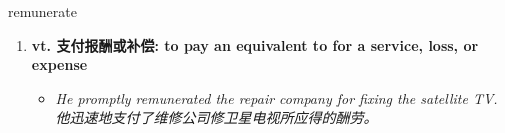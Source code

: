 
\begin{frame}
{\huge remunerate}
\begin{center}
\begin{enumerate}\Large
  \item \textbf{vt. 支付报酬或补偿: to pay an equivalent to for a service, loss, or expense}
  \begin{itemize}
    \item \em{\Large{He promptly remunerated the repair company for fixing the satellite TV. 他迅速地支付了维修公司修卫星电视所应得的酬劳。}}
  \end{itemize}
\end{enumerate}
\end{center}
\end{frame}
